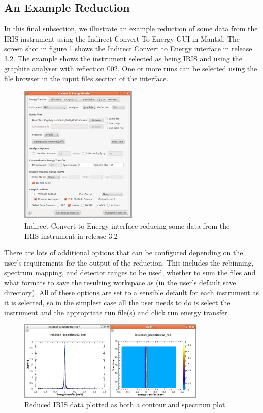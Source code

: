 \documentclass[paper=a4, fontsize=11pt]{scrartcl}	%
\numberwithin{equation}{section}															%
\numberwithin{figure}{section}																%
\numberwithin{table}{section}																%
\begin{document}
\subsection{An Example Reduction}
In this final subsection, we illustrate an example reduction of some data from the IRIS instrument using the Indirect Convert To Energy GUI in Mantid. The screen shot in figure \ref{fig:iris-c2e-reduction} shows the Indirect Convert to Energy interface in release 3.2. The example shows the instrument selected as being IRIS and using the graphite analyser with reflection 002. One or more runs can be selected using the file browser in the input files section of the interface.

\begin{figure}[H]
\centering
\includegraphics[width=0.5\textwidth]{img/iris-c2e-reduction.png}
\caption{Indirect Convert to Energy interface reducing some data from the IRIS instrument in release 3.2}
\label{fig:iris-c2e-reduction}
\end{figure}

There are lots of additional options that can be configured depending on the user's requirements for the output of the reduction. This includes the rebinning, spectrum mapping, and detector ranges to be used, whether to sum the files and what formats to save the resulting workspace as (in the user's default save directory). All of these options are set to a sensible default for each instrument as it is selected, so in the simplest case all the user needs to do is select the instrument and the appropriate run file(s) and click run energy transfer.

\begin{figure}[H]
\centering
\includegraphics[width=0.8\textwidth]{img/iris-c2e-reduction-plot.png}
\caption{Reduced IRIS data plotted as both a contour and spectrum plot}
\label{fig:iris-c2e-reduction-plot}
\end{figure}
\end{document}
